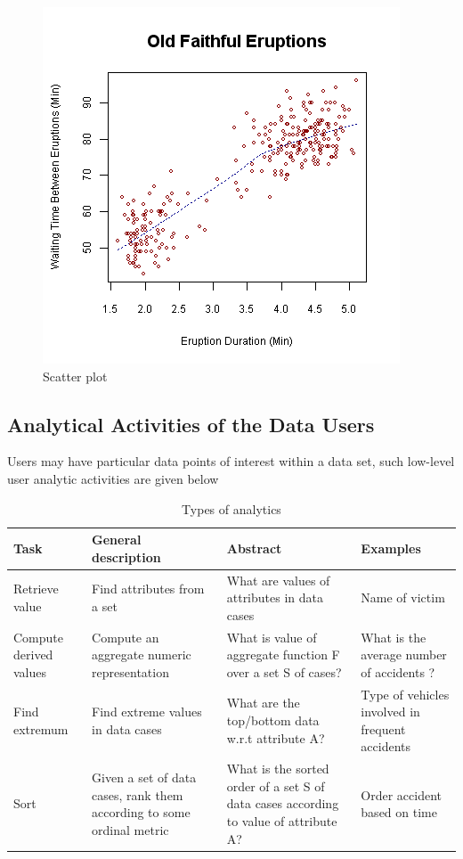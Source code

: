 \begin{figure}[h!]
	\centering
	\includegraphics[scale=0.4]{scatter}
	\caption{Scatter plot}
	\label{fig:scatter}
\end{figure}

\newpage
\subsection{Analytical Activities of the Data Users}
Users may have particular data points of interest within a data set, such low-level user analytic activities are given below

\begin{table}[!ht]
	\centering
	\begin{tabular}{| m{4em} | m{6em}| m{7em} | m{8em} |} 
		\hline
		\textbf{Task} & \textbf{General description} & \textbf{Abstract} & \textbf{Examples} \\ 
		\hline
		Retrieve value & Find attributes from a set & What are values of attributes in data cases & Name of victim\\ 
		\hline
		Compute derived values & Compute an aggregate numeric representation & What is value of aggregate function F over a set S of cases? & What is the average number of accidents ? \\ 
		\hline
		Find extremum & Find extreme values in data cases & What are the top/bottom data w.r.t attribute A? & Type of vehicles involved in frequent accidents \\
		\hline
		Sort & Given a set of data cases, rank them according to some ordinal metric & What is the sorted order of a set S of data cases according to value of attribute A? & Order accident based on time \\
		\hline
	\end{tabular}
	\caption{Types of analytics}
\end{table}